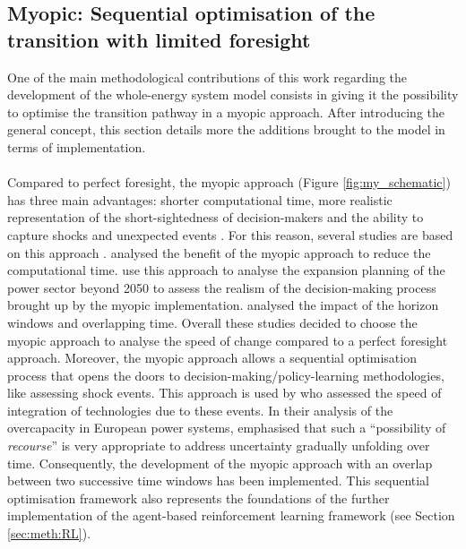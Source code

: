 \subsection[Myopic: Sequential optimisation of the transition]{Myopic: Sequential optimisation of the transition with limited foresight}
\label{subsec:meth:MY}

One of the main methodological contributions of this work regarding the development of the whole-energy system model consists in giving it the possibility to optimise the transition pathway in a myopic approach. After introducing the general concept, this section details more the additions brought to the model in terms of implementation.\\

\\

Compared to perfect foresight, the myopic approach (Figure \ref{fig:my_schematic}) has three main advantages: shorter computational time, more realistic representation of the short-sightedness of decision-makers and the ability to capture shocks and unexpected events \cite{mccollum2020energy}. For this reason, several studies are based on this approach \citep{babrowski2014reducing,poncelet2016myopic,nerini2017myopic,heuberger2018impact}. \citet{babrowski2014reducing} analysed the benefit of the myopic approach to reduce the computational time. \citet{poncelet2016myopic} use this approach to analyse the expansion planning of the power sector beyond 2050 to assess the realism of the decision-making process brought up by the myopic implementation. \citet{nerini2017myopic} analysed the impact of the horizon windows and overlapping time.  Overall these studies decided to choose the myopic approach to analyse the speed of change compared to a perfect foresight approach.
Moreover, the myopic approach allows a sequential optimisation process that opens the doors to decision-making/policy-learning methodologies, like assessing shock events. This approach is used by \citet{heuberger2018impact} who assessed the speed of integration of technologies due to these events. 
In their analysis of the overcapacity in European power systems, \citet{moret2020overcapacity} emphasised that such a ``possibility of \textit{recourse}'' is very appropriate to address uncertainty gradually unfolding over time. Consequently, the development of the myopic approach with an overlap between two successive time windows has been implemented. This sequential optimisation framework also represents the foundations of the further implementation of the agent-based reinforcement learning framework (see Section \ref{sec:meth:RL}).

